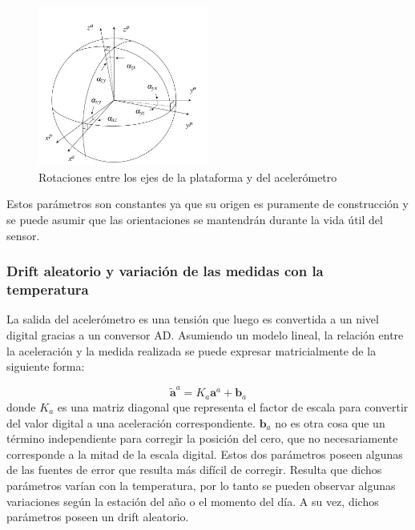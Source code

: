 \documentclass[spanish,12pt,a4paper,titlepage]{report}
\begin{document}
\begin{figure}
  \vspace{-20pt}
  \begin{center}
    \includegraphics[width=0.5\textwidth]{./pics/ejes_acc.jpg}
  \end{center}
  \vspace{-20pt}
  \caption{Rotaciones entre los ejes de la plataforma y del acelerómetro}
  \label{fig:ejes}
  \vspace{-10pt}
\end{figure}

Estos parámetros son constantes ya que su origen es puramente de construcción y se puede asumir que las orientaciones se mantendrán durante la vida útil del sensor.

\subsubsection*{Drift aleatorio y variación de las medidas con la temperatura}

La salida del acelerómetro es una tensión que luego es convertida a un nivel digital gracias a un conversor AD. Asumiendo un modelo lineal, la relación entre la aceleración y la medida realizada se puede expresar matricialmente de la siguiente forma:
 
$$\tilde{\mathbf{a}}^a = K_a \mathbf{a}^a + \mathbf{b}_a$$ donde $K_a$ es una matriz diagonal que representa el factor de escala para convertir del valor digital a una aceleración correspondiente. $\mathbf{b}_a$ no es otra cosa que un término independiente para corregir la posición del cero, que no necesariamente corresponde a la mitad de la escala digital. Estos dos parámetros poseen algunas de las fuentes de error que resulta más difícil de corregir. Resulta que dichos parámetros varían con la temperatura, por lo tanto se pueden observar algunas variaciones según la estación del año o el momento del día. A su vez, dichos parámetros poseen un drift aleatorio. 
\end{document}
